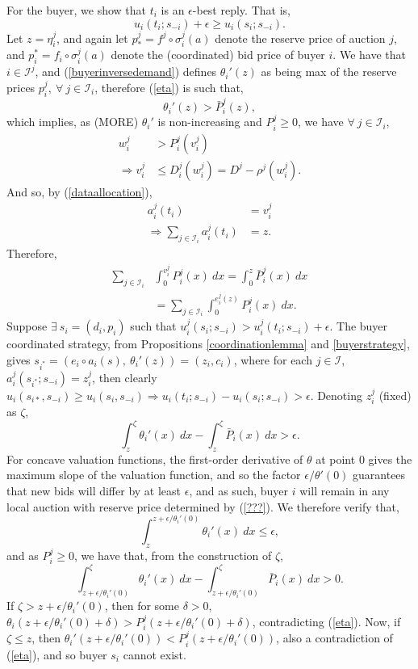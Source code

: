 \documentclass[12pt]{article}
\theoremstyle{definition}
\newcommand{\mcI}{\mathcal{I}}
\newcommand{\g}{\sigma}
\begin{document}
\begin{multicols}{2}
For the buyer, we show that $t_i$ is an $\epsilon$-best reply. That is,
$$
    u_i(t_i;s_{-i}) + \epsilon \ge u_i(s_i;s_{-i}).
$$
Let $z = \eta_i^j$, and again let $p_*^j = f^j \circ \g_i^j(a) $ denote the reserve
price of auction $j$, and $p_i^*= f_i \circ \g_i^j(a)$ denote the (coordinated) bid price of buyer $i$. 
We have that $i\in\mcI^j$, 
and (\ref{buyerinversedemand}) defines $\theta_i'(z)$ as being
max of the reserve prices $p_i^j,\ \forall \ j\in\mcI_i$, therefore
(\ref{eta}) is such that,
$$
    \theta_i'(z) > \bar{P}_i^j(z),
$$ 
which implies, as (MORE) $\theta_i'$ is non-increasing and $P_i^j \ge 0$,
we have $\forall \ j \in \mcI_i$, 
\begin{align*}
    w_i^j &> P_i^j(v_i^j) \\
    \Rightarrow v_i^j &\le D_i^j(w_i^j) = D^j - \rho^j(w_i^j).
\end{align*}
And so, by (\ref{dataallocation}),
\begin{align*}
    a_i^j(t_i) &= v_i^j \\
    \Rightarrow \displaystyle\sum_{j\in\mcI_i} a_i^j(t_i) &= z.
\end{align*}
Therefore,
\begin{align*}
    \displaystyle\sum_{j\in\mcI_i}&\int_0^{v_i^j} P_i^j(x) \ dx =  \int_0^{z}
    \bar{P}_i^j(x) \ dx \\
    &= \sum_{j\in\mcI_i}\int_0^{e_i^j(z)} P_i^j(x) \ dx.
\end{align*}
Suppose $\exists \ s_i = (d_i, p_i)$ such that $u_i^j(s_i;s_{-i}) > u_i^j(t_i;
s_{-i}) + \epsilon$. The buyer coordinated strategy, from Propositions
\ref{coordinationlemma} and
\ref{buyerstrategy}, gives $s_{i^*} = (e_i\circ a_i(s), \ \theta_i'(z)) =
(z_i, c_i)$, where
for each $j\in \mcI$, $a_i^j(s_{i^*}; s_{-i}) = z_i^j$,
then clearly $u_i(s_{i*}, s_{-i}) \ge u_i(s_i, s_{-i}) \Rightarrow u_i(t_i;s_{-i}) -
u_i(s_i;s_{-i}) > \epsilon$. Denoting $z_i^j$ (fixed) as $\zeta$, 
$$
    \int_z^{\zeta} {\theta_i}'(x) \ dx- \int_z^{\zeta} \bar{P}_i(x) \ dx > \epsilon.
$$
For concave valuation functions, the first-order derivative of $\theta$ at point
$0$ gives the maximum slope of the valuation function, and so the factor $\epsilon
/ \theta'(0)$ guarantees that new bids will differ by at least
$\epsilon$, and as such, buyer $i$ will remain in
any local auction with reserve price determined by (\ref{???}). We therefore
verify that,
$$
    \displaystyle\int_{z}^{z +\epsilon / \theta_i'(0)} \theta_i'(x) \
dx \le \epsilon,
$$
and as $P_i^j \ge 0$, we have that, from the construction of $\zeta$,
$$
    \displaystyle\int_{z+\epsilon / \theta_i'(0)}^\zeta \theta_i'(x) \ dx -
\int_{z+\epsilon / \theta_i'(0)}^\zeta \bar{P}_i(x) \ dx > 0.
$$
If $\zeta > z + \epsilon / \theta_i'(0)$, then for some $\delta >0$,
$\theta_i(z+\epsilon / \theta_i'(0)+\delta) > P_i^j(z+\epsilon /
\theta_i'(0)+\delta)$, contradicting (\ref{eta}).
Now, if $\zeta \le z$, then $\theta_i'(z+\epsilon / \theta_i'(0)) < P_i^j(z+\epsilon /
\theta_i'(0))$, also a contradiction of (\ref{eta}), and so buyer $s_i$ cannot
exist.


\end{multicols}
\end{document}
